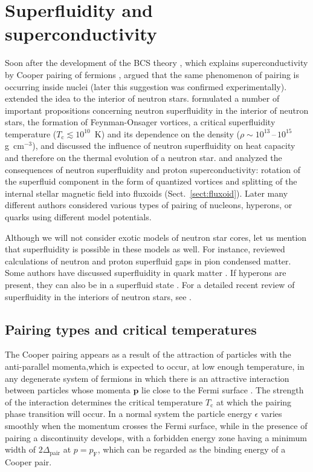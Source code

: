 \documentclass[smallextended]{svjour3}       %
\newcommand{\gcc}{\mbox{g~cm$^{-3}$}}
\newcommand{\pF}{p_\mathrm{F}}
\newcommand{\Tc}{T_\mathrm{c}}
\begin{document}
\section{Superfluidity and superconductivity}
\label{sect:SF}

Soon after the development of the BCS theory \citep{BCS57},
which explains superconductivity by Cooper pairing of
fermions \citep{Cooper56}, \citet{BohrMP} argued that the
same phenomenon of pairing is occurring inside nuclei (later
this suggestion was confirmed  experimentally).
\citet{Migdal59} extended the idea to the interior of
neutron stars.  \citet{GinzburgKirzhnits} formulated a
number of important propositions concerning neutron
superfluidity in the interior of neutron stars, the
formation of Feynman-Onsager vortices, a critical
superfluidity temperature ($\Tc\lesssim10^{10}$~K) and its
dependence on the density ($\rho\sim10^{13}$\,--\,$10^{15}$
\gcc), and discussed the influence of neutron superfluidity
on heat capacity and therefore on the thermal evolution of a
neutron star. \citet{BPP69a} and \citet{Ginzburg70} analyzed
the consequences of neutron superfluidity and proton
superconductivity: rotation of the superfluid component in
the form of quantized vortices and splitting of the internal
stellar magnetic field into fluxoids
(Sect.~\ref{sect:fluxoid}). Later many different authors
considered various types of pairing of nucleons, hyperons,
or quarks using different model potentials.

Although we will not consider exotic models of neutron star
cores, let us mention that superfluidity is possible in
these models as well. For instance,
\citet{TakatsukaTamagaki95} reviewed calculations of neutron
and proton superfluid gaps in pion condensed matter. Some
authors have discussed superfluidity in quark matter
\citep[e.g.,][]{StejnerWM09}. If hyperons are present, they can 
also be in a superfluid state \citep{BalbergBarnea98}. For a 
detailed recent review of superfluidity in the interiors of neutron 
stars, see \citet{Page-ea14}.

\subsection{Pairing types and critical temperatures}
\label{sect:pairing}

The Cooper pairing appears as a result of the attraction of
particles with the anti-parallel momenta,which is expected
to occur, at low enough temperature, in any degenerate
system of fermions in which there is an attractive
interaction between particles whose momenta $\bm{p}$ lie
close to the Fermi surface \citep{Cooper56}. The strength of
the interaction determines the critical temperature $\Tc$ at
which the pairing phase transition will occur. In a normal
system the particle energy $\epsilon$ varies smoothly when
the momentum crosses the Fermi surface, while in the
presence of pairing a discontinuity develops, with a
forbidden energy zone having a minimum width of
$2\Delta_\mathrm{pair}$ at $p=\pF$, which can be regarded as
the binding energy of a Cooper pair.
\end{document}
